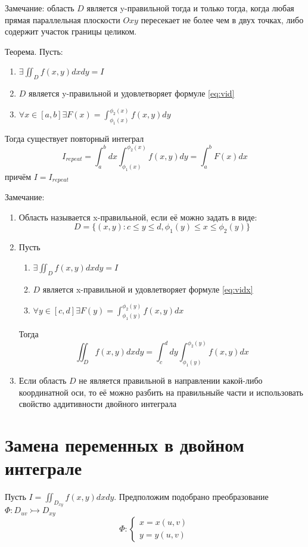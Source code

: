 \documentclass[a4paper, 12pt]{report}
\begin{document}
			Замечание: область $D$ является y-правильной тогда и только тогда, когда любая прямая параллельная плоскости $Oxy$ пересекает не более чем в двух точках, либо содержит участок границы целиком.
			
			Теорема. Пусть:
			\begin{enumerate}
				\item $\exists\iint_D f(x, y)dxdy=I$
				\item $D$ является y-правильной и удовлетворяет формуле \ref{eq:vid}
				\item $\forall x\in[a,b]\exists F(x)=\int_{\phi_1(x)}^{\phi_2(x)}f(x,y)dy$
			\end{enumerate}
			
			Тогда существует повторный интеграл
			\begin{equation}
				I_{repeat}=\int_a^bdx\int_{\phi_1(x)}^{\phi_2(x)}f(x,y)dy=\int_a^bF(x)dx
			\end{equation}
			причём $I = I_{repeat}$
			
			Замечание:
			\begin{enumerate}
				\item Область называется x-правилььной, если её можно задать в виде:
				\begin{equation}
					\label{eq:vidx}
					D=\{(x,y):c\le y\le d,\phi_1(y)\le x\le \phi_2(y)\}
				\end{equation}
				
				\item Пусть
				\begin{enumerate}
					\item $\exists\iint_D f(x, y)dxdy=I$
					\item $D$ является x-правильной и удовлетворяет формуле \ref{eq:vidx}
					\item $\forall y\in[c,d]\exists F(y)=\int_{\phi_1(y)}^{\phi_2(y)}f(x,y)dx$
				\end{enumerate}
			
				Тогда
				\begin{equation}
					\iint_Df(x,y)dxdy=\int_c^ddy\int_{\phi_1(y)}^{\phi_2(y)}f(x,y)dx
				\end{equation}
			
				\item Если область $D$ не является правильной в направлении какой-либо координатной оси, то её можно разбить на правильныйе части и использовать свойство аддитивности двойного интеграла
			\end{enumerate}
		
	\section{Замена переменных в двойном интеграле}
		Пусть $I=\iint_{D_{xy}}f(x,y)dxdy$. Предположим подобрано преобразование $\Phi:D_{uv}\rightarrowtail D_{xy}$
	 	\begin{equation}
	 		\Phi:\begin{cases}
	 			x=x(u,v) \\
	 			y=y(u,v)
	 		\end{cases}
	 	\end{equation}
 	
\end{document}
